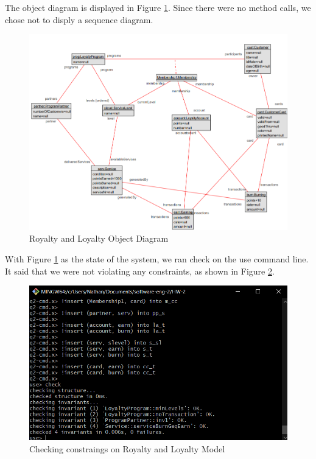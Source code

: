 \documentclass{article}
\begin{document}
	\noindent
	The object diagram is displayed in Figure \ref{fig:q2obj}. Since there were no method calls, we chose not to disply a sequence diagram.
	
	\begin{figure}[h]
		\includegraphics[width=\linewidth]{Q2obj.png}
		\caption{Royalty and Loyalty Object Diagram}
		\label{fig:q2obj}
	\end{figure}
	
	With Figure \ref{fig:q2obj} as the state of the system, we ran check on the use command line. It said that we were not violating any constraints, as shown in Figure \ref{fig:q2cmd}.
	
	\begin{figure}[h]
		\includegraphics[width=\linewidth]{Q2cmd.png}
		\caption{Checking constraings on Royalty and Loyalty Model}
		\label{fig:q2cmd}
	\end{figure}
	\newpage
\end{document}
